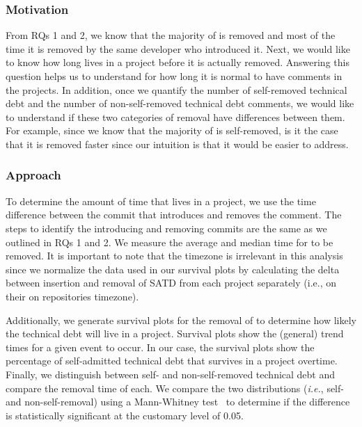 \subsubsection*{Motivation} From RQs 1 and 2, we know that the majority of \SATD is removed and most of the time it is removed by the same developer who introduced it. Next, we would like to know how long \SATD lives in a project before it is actually removed. Answering this question helps us to understand for how long it is normal to have \SATD comments in the projects. In addition, once we quantify the number of self-removed technical debt and the number of non-self-removed technical debt comments, we would like to understand if these two categories of removal have differences between them. For example, since we know that the majority of \SATD is self-removed, is it the case that it is removed faster since our intuition is that it would be easier to address. 

\subsubsection*{Approach} To determine the amount of time that \SATD lives in a project, we use the time difference between the commit that introduces and removes the \SATD comment. The steps to identify the \SATD introducing and removing commits are the same as we outlined in RQs 1 and 2. We measure the average and median time for \SATD to be removed. It is important to note that the timezone is irrelevant in this analysis since we normalize the data used in our survival plots by calculating the delta between insertion and removal of SATD from each project separately (i.e., on their on repositories timezone).

Additionally, we generate survival plots for the removal of \SATD to determine how likely the technical debt will live in a project. Survival plots show the (general) trend times for a given event to occur. In our case, the survival plots show the  percentage of self-admitted technical debt that survives in a project overtime. Finally, we distinguish between self- and non-self-removed technical debt and compare the removal time of each. We compare the two distributions (\emph{i.e.}, self- and non-self-removal) using a Mann-Whitney test~\cite{mann1947test} to determine if the difference is statistically significant at the customary level of 0.05.

